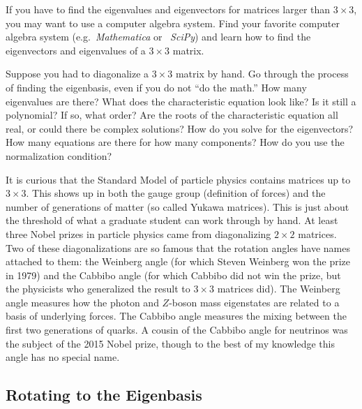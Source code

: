 \documentclass[12pt]{article}
\begin{document}
\begin{exercise}
If you have to find the eigenvalues and eigenvectors for matrices larger than $3\times 3$, you may want to use a computer algebra system. Find your favorite computer algebra system (e.g.~\emph{Mathematica} or ~\emph{SciPy}) and learn how to find the eigenvectors and eigenvalues of a $3\times 3$ matrix. 
\end{exercise}

\begin{exercise}
Suppose you had to diagonalize a $3\times 3$ matrix by hand. Go through the process of finding the eigenbasis, even if you do not ``do the math.'' How many eigenvalues are there? What does the characteristic equation look like? Is it still a polynomial? If so, what order? Are the roots of the characteristic equation all real, or could there be complex solutions? How do you solve for the eigenvectors? How many equations are there for how many components? How do you use the normalization condition? 
\end{exercise}

\begin{example}
It is curious that the Standard Model of particle physics contains matrices up to $3\times 3$. This shows up in both the gauge group (definition of forces) and the number of generations of matter (so called Yukawa matrices). This is just about the threshold of what a graduate student can work through by hand. At least three Nobel prizes in particle physics came from diagonalizing $2\times 2$ matrices. Two of these diagonalizations are so famous that the rotation angles have names attached to them: the Weinberg angle (for which Steven Weinberg won the prize in 1979) and the Cabbibo angle (for which Cabbibo did not win the prize, but the physicists who generalized the result to $3\times 3$ matrices did). The Weinberg angle measures how the photon and $Z$-boson mass eigenstates are related to a basis of underlying forces. The Cabbibo angle measures the mixing between the first two generations of quarks. A cousin of the Cabbibo angle for neutrinos was the subject of the 2015 Nobel prize, though to the best of my knowledge this angle has no special name.
\end{example}

\subsection{Rotating to the Eigenbasis}
\label{sec:rotation:to:eigenbasis}
\end{document}
